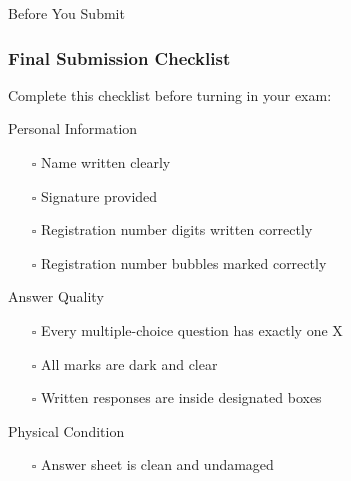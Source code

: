 \documentclass{beamer}
\begin{document}
\begin{frame}{Before You Submit}
\frametitle{Final Submission Checklist}
Complete this checklist before turning in your exam:

\begin{block}{Personal Information}
\begin{itemize}
\item[$\square$] Name written clearly
\item[$\square$] Signature provided  
\item[$\square$] Registration number digits written correctly
\item[$\square$] Registration number bubbles marked correctly
\end{itemize}
\end{block}

\begin{block}{Answer Quality}
\begin{itemize}
\item[$\square$] Every multiple-choice question has exactly one X
\item[$\square$] All marks are dark and clear
\item[$\square$] Written responses are inside designated boxes
\end{itemize}
\end{block}

\begin{block}{Physical Condition}
\begin{itemize}
\item[$\square$] Answer sheet is clean and undamaged
\end{itemize}
\end{block}
\end{frame}
\end{document}
